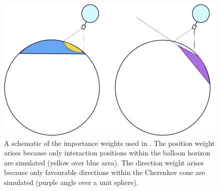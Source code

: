 

\begin{figure}[!h]\centering
  \includegraphics[width=.8\linewidth, trim = 0 6.5cm 0 0, clip]{./Figs/icemcWeightScheme.png}
  \caption{A schematic of the importance weights used in \icemc. The
    position weight arises because only interaction positions within
    the balloon horizon are simulated (yellow over blue area).
  The direction weight arises because only favourable directions within the
  Cherenkov cone are simulated (purple angle over a unit sphere).}
  \label{fig:weights}
\end{figure}
